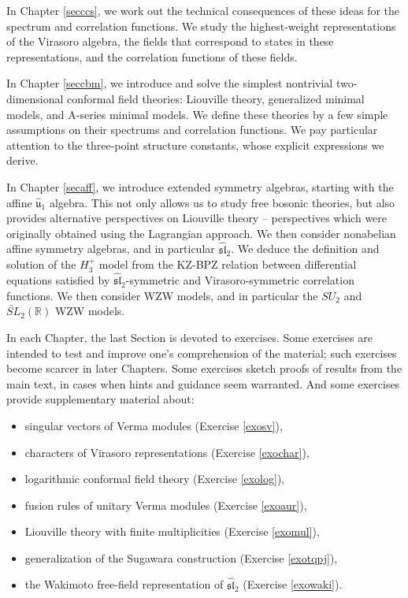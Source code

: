 \documentclass[12pt, a4paper, notitlepage, twoside]{report}
\numberwithin{equation}{section}
\theoremstyle{break}
\begin{document}
In Chapter \ref{secccs}, we work out the technical consequences of these ideas for the spectrum and correlation functions.
We study the highest-weight representations of the Virasoro algebra, the fields that correspond to states in these representations, and the correlation functions of these fields. 

In Chapter \ref{seccbm}, we introduce and solve the simplest nontrivial two-dimensional conformal field theories: Liouville theory, generalized minimal models, and A-series minimal models.
We define these theories by a few simple assumptions on their spectrums and correlation functions.
We pay particular attention to the three-point structure constants, whose explicit expressions we derive. 

In Chapter \ref{secaff}, we introduce extended symmetry algebras, starting with the affine $\hat{\mathfrak{u}}_1$ algebra.
This not only allows us to study free bosonic theories, but also provides alternative perspectives on Liouville theory -- perspectives which were originally obtained using the Lagrangian approach.
We then consider nonabelian affine symmetry algebras, and in particular $\widehat{\mathfrak{sl}}_2$.
We deduce the definition and solution of the $H_3^+$ model from the KZ-BPZ relation between differential equations satisfied by $\widehat{\mathfrak{sl}}_2$-symmetric and Virasoro-symmetric correlation functions.
We then consider WZW models, and in particular the $SU_2$ and $\widetilde{SL}_2(\mathbb{R})$ WZW models. 

In each Chapter, the last Section is devoted to exercises.
Some exercises are intended to test and improve one's comprehension of the material; such exercises become scarcer in later Chapters.
Some exercises sketch proofs of results from the main text, in cases when hints and guidance seem warranted.
And some exercises provide supplementary material about: 
\begin{itemize}
 \item singular vectors of Verma modules (Exercise \ref{exosv}),
 \item characters of Virasoro representations (Exercise \ref{exochar}),
\item logarithmic conformal field theory (Exercise \ref{exolog}), 
\item fusion rules of unitary Verma modules (Exercise \ref{exoaur}), 
\item Liouville theory with finite multiplicities (Exercise \ref{exomul}),
\item generalization of the Sugawara construction (Exercise \ref{exotqpj}),
\item the Wakimoto free-field representation of $\widehat{\mathfrak{sl}}_2$ (Exercise \ref{exowaki}).
\end{itemize}
\end{document}
